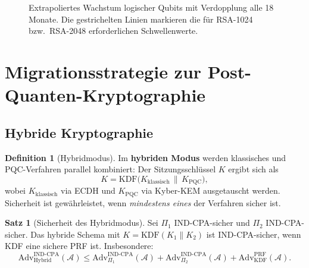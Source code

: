 ﻿\documentclass[a4paper,12pt]{article}
\theoremstyle{definition}
\newtheorem{definition}{Definition}[section]
\newtheorem{satz}{Satz}[section]
\begin{document}
\begin{figure}[H]
\centering
{}
\caption{Extrapoliertes Wachstum logischer Qubits mit Verdopplung alle 18 Monate. Die gestrichelten Linien markieren die für RSA-1024 bzw.\ RSA-2048 erforderlichen Schwellenwerte.}
\label{fig:qubits}
\end{figure}

\section{Migrationsstrategie zur Post-Quanten-Kryptographie}

\subsection{Hybride Kryptographie}

\begin{definition}[Hybridmodus]
Im \textbf{hybriden Modus} werden klassisches und PQC-Verfahren parallel
kombiniert: Der Sitzungsschlüssel $K$ ergibt sich als
\[
  K = \mathrm{KDF}\bigl(K_\mathrm{klassisch} \,\|\, K_\mathrm{PQC}\bigr),
\]
wobei $K_\mathrm{klassisch}$ via ECDH und $K_\mathrm{PQC}$ via Kyber-KEM
ausgetauscht werden. Sicherheit ist gewährleistet, wenn \emph{mindestens eines}
der Verfahren sicher ist.
\end{definition}

\begin{satz}[Sicherheit des Hybridmodus]
Sei $\Pi_1$ IND-CPA-sicher und $\Pi_2$ IND-CPA-sicher. Das hybride Schema
mit $K = \mathrm{KDF}(K_1 \| K_2)$ ist IND-CPA-sicher, wenn KDF
eine sichere PRF ist. Insbesondere:
\[
  \mathrm{Adv}^{\mathrm{IND\text{-}CPA}}_{\mathrm{Hybrid}}(\mathcal{A})
  \leq \mathrm{Adv}^{\mathrm{IND\text{-}CPA}}_{\Pi_1}(\mathcal{A})
  + \mathrm{Adv}^{\mathrm{IND\text{-}CPA}}_{\Pi_2}(\mathcal{A})
  + \mathrm{Adv}^{\mathrm{PRF}}_{\mathrm{KDF}}(\mathcal{A}).
\]
\end{satz}
\end{document}
